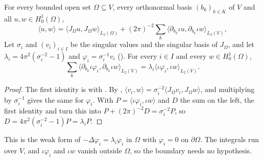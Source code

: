 \begin{theorem}
\label{thm:dirichlet-weak-eigen}
\leanok
{}
For every bounded open set $\Omega \subseteq V$, every orthonormal basis $(b_k)_{k \in K}$ of $V$
and all $u, w \in H^1_0(\Omega)$,
\[
  \langle u, w \rangle = \langle J_\Omega u, J_\Omega w \rangle_{L_2(\Omega)}
    + (2\pi)^{-2} \sum_k \langle \partial_{b_k} \iota u, \partial_{b_k} \iota w \rangle_{L_2(V)},
\]
Let $\sigma_i$ and $(v_i)_{i \in I}$ be the singular values and the singular basis of $J_\Omega$,
and let $\lambda_i = 4\pi^2 (\sigma_i^{-2} - 1)$ and $\varphi_i = \sigma_i^{-1} v_i$
(). For every $i \in I$ and every $w \in H^1_0(\Omega)$,
\[
  \sum_k \langle \partial_{b_k} \iota \varphi_i, \partial_{b_k} \iota w \rangle_{L_2(V)}
    = \lambda_i \langle \iota \varphi_i, \iota w \rangle_{L_2(V)} .
\]
\end{theorem}

\begin{proof}
\leanok
The first identity is  with . By
, $\langle v_i, w \rangle = \sigma_i^{-2}
\langle J_\Omega v_i, J_\Omega w \rangle$, and multiplying by $\sigma_i^{-1}$ gives the same for
$\varphi_i$. With $P = \langle \iota \varphi_i, \iota w \rangle$ and $D$ the sum on the left,
the first identity and  turn this into
$P + (2\pi)^{-2} D = \sigma_i^{-2} P$, so $D = 4\pi^2 (\sigma_i^{-2} - 1) P = \lambda_i P$.
\end{proof}

This is the weak form of $-\Delta \varphi_i = \lambda_i \varphi_i$ in $\Omega$ with
$\varphi_i = 0$ on $\partial \Omega$. The integrals run over $V$, and $\iota \varphi_i$ and
$\iota w$ vanish outside $\Omega$, so the boundary needs no hypothesis.

